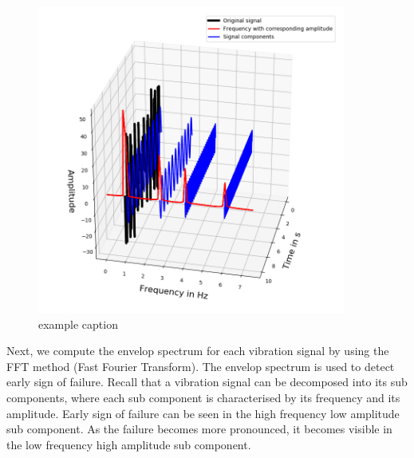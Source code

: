 \documentclass[11pt, oneside]{article}   	%
\begin{document}
\begin{flushleft}
\begin{figure}[H] %
   \centering
   \includegraphics[width=4in]{decomposition} 
   \caption{example caption}
   \label{fig:example}
\end{figure}

Next, we compute the envelop spectrum for each vibration signal by using the FFT method (Fast Fourier Transform). The envelop spectrum is used to detect early sign of failure. Recall that a vibration signal can be decomposed into its sub components, where each  sub component 
is characterised by its frequency and its amplitude. Early sign of failure can be seen in the high frequency low amplitude sub component. As the failure becomes more pronounced, it becomes visible in the low frequency high amplitude sub component.
\end{flushleft}
\end{document}

